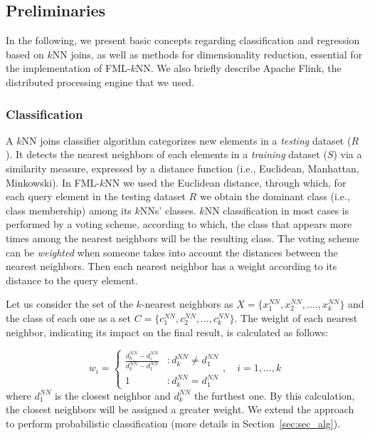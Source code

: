 \subsection{Preliminaries} 
\label{sec:preliminaries}
In the following, we present basic concepts regarding classification and regression based on $k$NN joins, as well as methods for dimensionality reduction, essential for the implementation of FML-$k$NN. We also briefly describe Apache Flink, the distributed processing engine that we used.

\subsubsection{Classification}
\label{subsec:classification}
A $k$NN joins classifier algorithm categorizes new elements in a \textit{testing} dataset ($R$). It detects the nearest neighbors of each elements in a \textit{training} dataset ($S$) via a similarity measure, expressed by a distance function (i.e., Euclidean, Manhattan, Minkowski). In FML-$k$NN we used the Euclidean distance, through which, for each query element in the testing dataset $R$ we obtain the dominant class (i.e., class membership) among its $k$NNs' classes. $k$NN classification in most cases is performed by a voting scheme, according to which, the class that appears more times among the nearest neighbors will be the resulting class. The voting scheme can be \textit{weighted} when someone takes into account the distances between the nearest neighbors. Then each nearest neighbor has a weight according to its distance to the query element.

Let us consider the set of the $k$-nearest neighbors as $X = \{x_{1}^{NN}, x_{2}^{NN}, ...., x_{k}^{NN}\}$ and the class of each one as a set $C = \{c_{1}^{NN}, c_{2}^{NN}, ..., c_{k}^{NN}\}$. The weight of each nearest neighbor, indicating its impact on the final result, is calculated as follows:

\begin{equation}
	w_{i} = \left\{
		\begin{array}{lr}
			\frac{d_{k}^{NN} - d_{i}^{NN}}{d_{k}^{NN} - d_{1}^{NN}} & : d_{k}^{NN} \neq d_{1}^{NN}\\
			1 & : d_{k}^{NN} = d_{1}^{NN}
		\end{array}
	\right., \quad i=1, ..., k
\end{equation}
where $d_{1}^{NN}$ is the closest neighbor and $d_{k}^{NN}$ the furthest one. By this calculation, the closest neighbors will be assigned a greater weight. We extend the approach to perform probabilistic classification (more details in Section~\ref{sec:sec_alg}).

